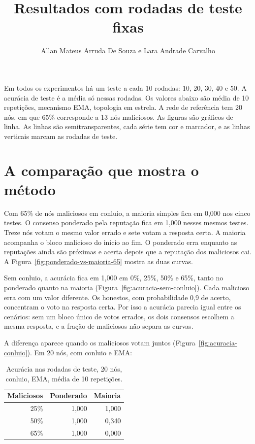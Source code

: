 \documentclass[11pt,a4paper]{article}
\title{Resultados com rodadas de teste fixas}
\author{Allan Mateus Arruda De Souza e Lara Andrade Carvalho}
\date{}
\begin{document}
\maketitle

Em todos os experimentos há um teste a cada 10 rodadas: 10, 20, 30, 40 e 50.
A acurácia de teste é a média só nessas rodadas.
Os valores abaixo são média de 10 repetições, mecanismo EMA, topologia em estrela.
A rede de referência tem 20 nós, em que 65\% corresponde a 13 nós maliciosos.
As figuras são gráficos de linha.
As linhas são semitransparentes, cada série tem cor e marcador, e as linhas verticais marcam as rodadas de teste.

\section{A comparação que mostra o método}

Com 65\% de nós maliciosos em conluio, a maioria simples fica em 0{,}000 nos cinco testes.
O consenso ponderado pela reputação fica em 1{,}000 nesses mesmos testes.
Treze nós votam o mesmo valor errado e sete votam a resposta certa.
A maioria acompanha o bloco malicioso do início ao fim.
O ponderado erra enquanto as reputações ainda são próximas e acerta depois que a reputação dos maliciosos cai.
A Figura~\ref{fig:ponderado-vs-maioria-65} mostra as duas curvas.

Sem conluio, a acurácia fica em 1{,}000 em 0\%, 25\%, 50\% e 65\%, tanto no ponderado quanto na maioria (Figura~\ref{fig:acuracia-sem-conluio}).
Cada malicioso erra com um valor diferente.
Os honestos, com probabilidade 0{,}9 de acerto, concentram o voto na resposta certa.
Por isso a acurácia parecia igual entre os cenários: sem um bloco único de votos errados, os dois consensos escolhem a mesma resposta, e a fração de maliciosos não separa as curvas.

A diferença aparece quando os maliciosos votam juntos (Figura~\ref{fig:acuracia-conluio}).
Em 20 nós, com conluio e EMA:

\begin{table}[htbp]
  \centering
  \caption{Acurácia nas rodadas de teste, 20 nós, conluio, EMA, média de 10 repetições.}
  \label{tab:testes-conluio}
  \begin{tabular}{rrr}
    \toprule
    Maliciosos & Ponderado & Maioria \\
    \midrule
    25\% & 1{,}000 & 1{,}000 \\
    50\% & 1{,}000 & 0{,}340 \\
    65\% & 1{,}000 & 0{,}000 \\
    \bottomrule
  \end{tabular}
\end{table}
\end{document}
